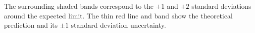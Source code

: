 The surrounding shaded bands correspond to the $\pm1$ and $\pm2$ standard deviations around the expected limit. 
The thin red line and band show the theoretical prediction and its $\pm1$ standard deviation uncertainty.

